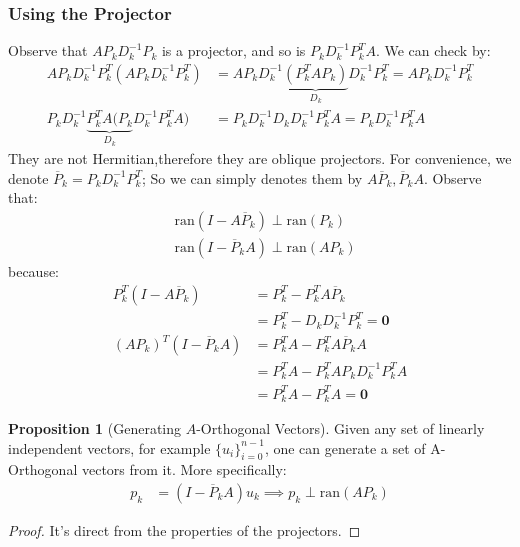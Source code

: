 \documentclass[]{article}
\theoremstyle{definition}
\newtheorem{prop}{Proposition}[section]  %
\begin{document}
        \subsubsection{Using the Projector}
            Observe that $AP_kD_k^{-1}P_k$ is a projector, and so is $P_kD^{-1}_kP_k^TA$. We can check by: 
            \begin{align}
                AP_kD^{-1}_kP_k^T(AP_kD^{-1}_kP_k^T) 
                &= 
                AP_kD^{-1}_k
                    \underbrace{(P_k^TAP_k)}_{D_k}
                D^{-1}_kP_k^T  = AP_kD_k^{-1}P_k^T 
                \\
                P_kD^{-1}_k
                \underbrace{P_k^{T}A(P_k}_{D_k}
                D^{-1}_kP_k^{T}
                A) &= P_kD^{-1}_kD_kD_{k}^{-1}P^T_kA
                = P_kD^{-1}_kP^T_kA
            \end{align}
            \noindent
            They are not Hermitian,therefore they are oblique projectors. For convenience, we denote $\overline{P}_k = P_kD_k^{-1}P_k^{T}$; So we can simply denotes them by $A\overline{P}_k, \overline{P}_kA$. Observe that: 
            \begin{align}
                & \text{ran}(I - A\overline{P}_k )\perp \text{ran}(P_k)
                \\
                & \text{ran}(I - \overline{P}_kA) \perp \text{ran}(AP_k)
            \end{align}
            because:
            \begin{align}
                P_k^T(I - A\overline{P}_k) &= P_k^T - P_k^{T}A\overline{P}_k
                \\
                &= P_k^{T} - D_kD_k^{-1}P^T_k = \mathbf{0}
                \\
                (AP_k)^T(I - \overline{P}_kA) &=P_k^TA - P_k^TA\overline{P}_kA
                \\
                &= P_k^TA - P_k^TAP_kD_k^{-1}P_k^TA
                \\
                &= P_k^TA - P^T_kA = \mathbf{0}
            \end{align}
            
            
            \begin{prop}[Generating $A$-Orthogonal Vectors]
                Given any set of linearly independent vectors, for example $\{u_i\}_{i = 0}^{n - 1}$, one can generate a set of A-Orthogonal vectors from it. More specifically:
                \begin{align}
                    p_k &= (I - \overline{P}_kA)u_k \implies p_k \perp \text{ran}(AP_k)
                \end{align}
            \end{prop}
            \begin{proof}
                It's direct from the properties of the projectors.
            \end{proof}
            
\end{document}
